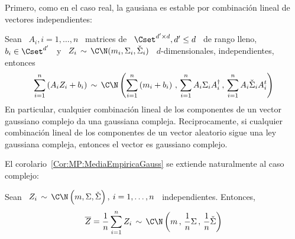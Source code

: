 Primero, como en  el caso real, la gausiana es  estable por combinaci\'on lineal
de vectores independientes:
%
\begin{teorema}[Stabilidad]
\label{Teo:MP:StabilidadGaussianaCompleja}
%
Sean \ $A_i , i = 1,\ldots,n$ \  matrices de \ $\Cset^{d' \times d}, d' \le d$ \
de   rango   lleno,   $b_i  \in   \Cset^{d'}$   \   y   \   $Z_i  \,   \sim   \,
\C\N(m_i,\Sigma_i,\check{\Sigma}_i)$    \   $d$-dimensionales,   independientes,
entonces
  \[
  \sum_{i=1}^n \left( A_i  Z_i + b_i \right) \,  \sim \, \C\N\left( \sum_{i=1}^n
    \left( m_i + b_i \right) \, ,  \, \sum_{i=1}^n A_i \Sigma_i A_i^\dag \, , \,
    \sum_{i=1}^n A_i \check{\Sigma}_i A_i^t \right)
  \]
  En particular, cualquier combinaci\'on lineal  de los componentes de un vector
  gaussiano complejo  da una  gaussiana compleja.  Reciprocamente,  si cualquier
  combinaci\'on lineal de  los componentes de un vector  aleatorio sigue una ley
  gaussiana compleja, entonces el vector es gaussiano complejo.
\end{teorema}
%
El corolario~\ref{Cor:MP:MediaEmpiricaGauss} se extiende naturalmente al caso complejo:
%
\begin{corolario}\label{Cor:MP:MediaEmpiricaGaussCompleja}
%
  Sean \ $Z_i \, \sim \, \C\N\left(  m , \Sigma , \check{\Sigma} \right), \: i =
  1, \ldots , n$ \ independientes. Entonces,
  \[
  \overline{Z} =  \frac{1}{n} \sum_{i=1}^n Z_i \,  \sim \, \C\N\left( m  \, , \,
    \frac{1}{n} \Sigma \, , \, \frac{1}{n} \check{\Sigma} \right)
  \]
\end{corolario}

